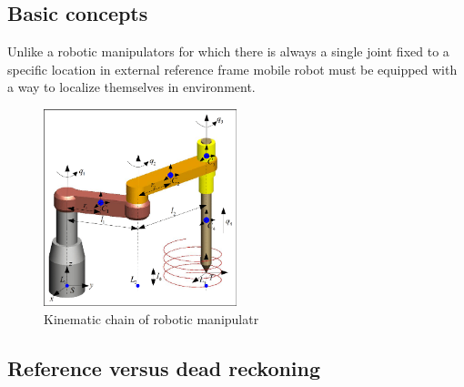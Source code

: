 \subsection{Basic concepts}
Unlike a robotic manipulators for which there is always a single joint fixed to a specific
location in external reference frame mobile robot must be equipped with a way to localize
themselves in environment.
\begin{figure}[hb]
	\includegraphics[width=0.5\textwidth]{figures/robot_arm_reference}
	\caption{Kinematic chain of robotic manipulatr}
	\label{fig:robot_arm_reference}
\end{figure}


\subsection{Reference versus dead reckoning}

